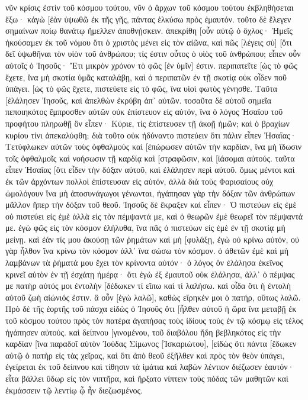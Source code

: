 νῦν κρίσις ἐστὶν τοῦ κόσμου τούτου, νῦν ὁ ἄρχων τοῦ κόσμου τούτου ἐκβληθήσεται ἔξω· 
κἀγὼ [ἐὰν ὑψωθῶ ἐκ τῆς γῆς, πάντας ἑλκύσω πρὸς ἐμαυτόν. 
τοῦτο δὲ ἔλεγεν σημαίνων ποίῳ θανάτῳ ἤμελλεν ἀποθνῄσκειν. 
ἀπεκρίθη [οὖν αὐτῷ ὁ ὄχλος· Ἡμεῖς ἠκούσαμεν ἐκ τοῦ νόμου ὅτι ὁ χριστὸς μένει εἰς τὸν αἰῶνα, καὶ πῶς [λέγεις σὺ] [ὅτι δεῖ ὑψωθῆναι τὸν υἱὸν τοῦ ἀνθρώπου; τίς ἐστιν οὗτος ὁ υἱὸς τοῦ ἀνθρώπου; 
εἶπεν οὖν αὐτοῖς ὁ Ἰησοῦς· Ἔτι μικρὸν χρόνον τὸ φῶς [ἐν ὑμῖν] ἐστιν. περιπατεῖτε [ὡς τὸ φῶς ἔχετε, ἵνα μὴ σκοτία ὑμᾶς καταλάβῃ, καὶ ὁ περιπατῶν ἐν τῇ σκοτίᾳ οὐκ οἶδεν ποῦ ὑπάγει. 
[ὡς τὸ φῶς ἔχετε, πιστεύετε εἰς τὸ φῶς, ἵνα υἱοὶ φωτὸς γένησθε. Ταῦτα [ἐλάλησεν Ἰησοῦς, καὶ ἀπελθὼν ἐκρύβη ἀπ᾽ αὐτῶν. 
τοσαῦτα δὲ αὐτοῦ σημεῖα πεποιηκότος ἔμπροσθεν αὐτῶν οὐκ ἐπίστευον εἰς αὐτόν, 
ἵνα ὁ λόγος Ἠσαΐου τοῦ προφήτου πληρωθῇ ὃν εἶπεν· Κύριε, τίς ἐπίστευσεν τῇ ἀκοῇ ἡμῶν; καὶ ὁ βραχίων κυρίου τίνι ἀπεκαλύφθη; 
διὰ τοῦτο οὐκ ἠδύναντο πιστεύειν ὅτι πάλιν εἶπεν Ἠσαΐας· 
Τετύφλωκεν αὐτῶν τοὺς ὀφθαλμοὺς καὶ [ἐπώρωσεν αὐτῶν τὴν καρδίαν, ἵνα μὴ ἴδωσιν τοῖς ὀφθαλμοῖς καὶ νοήσωσιν τῇ καρδίᾳ καὶ [στραφῶσιν, καὶ [ἰάσομαι αὐτούς. 
ταῦτα εἶπεν Ἠσαΐας [ὅτι εἶδεν τὴν δόξαν αὐτοῦ, καὶ ἐλάλησεν περὶ αὐτοῦ. 
ὅμως μέντοι καὶ ἐκ τῶν ἀρχόντων πολλοὶ ἐπίστευσαν εἰς αὐτόν, ἀλλὰ διὰ τοὺς Φαρισαίους οὐχ ὡμολόγουν ἵνα μὴ ἀποσυνάγωγοι γένωνται, 
ἠγάπησαν γὰρ τὴν δόξαν τῶν ἀνθρώπων μᾶλλον ἤπερ τὴν δόξαν τοῦ θεοῦ. 
Ἰησοῦς δὲ ἔκραξεν καὶ εἶπεν· Ὁ πιστεύων εἰς ἐμὲ οὐ πιστεύει εἰς ἐμὲ ἀλλὰ εἰς τὸν πέμψαντά με, 
καὶ ὁ θεωρῶν ἐμὲ θεωρεῖ τὸν πέμψαντά με. 
ἐγὼ φῶς εἰς τὸν κόσμον ἐλήλυθα, ἵνα πᾶς ὁ πιστεύων εἰς ἐμὲ ἐν τῇ σκοτίᾳ μὴ μείνῃ. 
καὶ ἐάν τίς μου ἀκούσῃ τῶν ῥημάτων καὶ μὴ [φυλάξῃ, ἐγὼ οὐ κρίνω αὐτόν, οὐ γὰρ ἦλθον ἵνα κρίνω τὸν κόσμον ἀλλ᾽ ἵνα σώσω τὸν κόσμον. 
ὁ ἀθετῶν ἐμὲ καὶ μὴ λαμβάνων τὰ ῥήματά μου ἔχει τὸν κρίνοντα αὐτόν· ὁ λόγος ὃν ἐλάλησα ἐκεῖνος κρινεῖ αὐτὸν ἐν τῇ ἐσχάτῃ ἡμέρᾳ· 
ὅτι ἐγὼ ἐξ ἐμαυτοῦ οὐκ ἐλάλησα, ἀλλ᾽ ὁ πέμψας με πατὴρ αὐτός μοι ἐντολὴν [δέδωκεν τί εἴπω καὶ τί λαλήσω. 
καὶ οἶδα ὅτι ἡ ἐντολὴ αὐτοῦ ζωὴ αἰώνιός ἐστιν. ἃ οὖν [ἐγὼ λαλῶ], καθὼς εἴρηκέν μοι ὁ πατήρ, οὕτως λαλῶ. 
Πρὸ δὲ τῆς ἑορτῆς τοῦ πάσχα εἰδὼς ὁ Ἰησοῦς ὅτι [ἦλθεν αὐτοῦ ἡ ὥρα ἵνα μεταβῇ ἐκ τοῦ κόσμου τούτου πρὸς τὸν πατέρα ἀγαπήσας τοὺς ἰδίους τοὺς ἐν τῷ κόσμῳ εἰς τέλος ἠγάπησεν αὐτούς. 
καὶ δείπνου [γινομένου, τοῦ διαβόλου ἤδη βεβληκότος εἰς τὴν καρδίαν [ἵνα παραδοῖ αὐτὸν Ἰούδας Σίμωνος [Ἰσκαριώτου], 
[εἰδὼς ὅτι πάντα [ἔδωκεν αὐτῷ ὁ πατὴρ εἰς τὰς χεῖρας, καὶ ὅτι ἀπὸ θεοῦ ἐξῆλθεν καὶ πρὸς τὸν θεὸν ὑπάγει, 
ἐγείρεται ἐκ τοῦ δείπνου καὶ τίθησιν τὰ ἱμάτια καὶ λαβὼν λέντιον διέζωσεν ἑαυτόν· 
εἶτα βάλλει ὕδωρ εἰς τὸν νιπτῆρα, καὶ ἤρξατο νίπτειν τοὺς πόδας τῶν μαθητῶν καὶ ἐκμάσσειν τῷ λεντίῳ ᾧ ἦν διεζωσμένος. 
